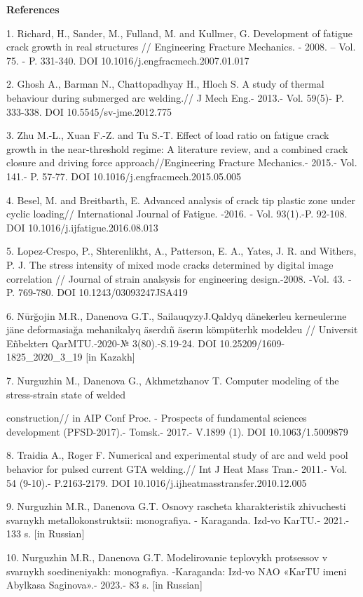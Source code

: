 \begin{center}
{\bfseries References}
\end{center}

\begin{noparindent}
1. Richard, H., Sander, M., Fulland, M. and Kullmer, G. Development of
fatigue crack growth in real structures // Engineering Fracture
Mechanics. - 2008. -- Vol. 75. - P. 331-340. DOI
10.1016/j.engfracmech.2007.01.017

2. Ghosh A., Barman N., Chattopadhyay H., Hloch S. A study of thermal
behaviour during submerged arc welding.// J Mech Eng.- 2013.- Vol.
59(5)- P. 333-338. DOI 10.5545/sv-jme.2012.775

3. Zhu M.-L., Xuan F.-Z. and Tu S.-T. Effect of load ratio on fatigue
crack growth in the near-threshold regime: A literature review, and a
combined crack closure and driving force approach//Engineering Fracture
Mechanics.- 2015.- Vol. 141.- P. 57-77. DOI
10.1016/j.engfracmech.2015.05.005

4. Besel, M. and Breitbarth, E. Advanced analysis of crack tip plastic
zone under cyclic loading// International Journal of Fatigue. -2016. -
Vol. 93(1).-P. 92-108. DOI 10.1016/j.ijfatigue.2016.08.013

5. Lopez-Crespo, P., Shterenlikht, A., Patterson, E. A., Yates, J. R.
and Withers, P. J. The stress intensity of mixed mode cracks determined
by digital image correlation // Journal of strain analsysis for
engineering design.-2008. -Vol. 43. - P. 769-780. DOI
10.1243/03093247JSA419

6. Nūrğojin M.R., Danenova G.T., SailauqyzyJ.Qaldyq dänekerleu
kerneulerıne jäne deformasiağa mehanikalyq äserdıñ äserın kömpüterlık
modeldeu // Universit Eñbekterı QarMTU.-2020-№ 3(80).-S.19-24. DOI
10.25209/1609- 1825\_2020\_3\_19 {[}in Kazakh{]}

7. Nurguzhin M., Danenova G., Akhmetzhanov T. Computer modeling of the
stress-strain state of welded

construction// in AIP Conf Proc. -
Prospects of fundamental sciences development (PFSD-2017).- Tomsk.-
2017.- V.1899 (1). DOI 10.1063/1.5009879

8. Traidia A., Roger F. Numerical and experimental study of arc and weld
pool behavior for pulsed current GTA welding.// Int J Heat Mass Tran.-
2011.- Vol. 54 (9-10).- P.2163-2179. DOI
10.1016/j.ijheatmasstransfer.2010.12.005

9. Nurguzhin M.R., Danenova G.T. Osnovy rascheta kharakteristik
zhivuchesti svarnykh metallokonstruktsii: monografiya. - Karaganda.
Izd-vo KarTU.- 2021.- 133 s. {[}in Russian{]}

10. Nurguzhin M.R., Danenova G.T. Modelirovanie teplovykh protsessov v
svarnykh soedineniyakh: monografiya. -Karaganda: Izd-vo NAO «KarTU imeni
Abylkasa Saginova».- 2023.- 83 s. {[}in Russian{]}
\end{noparindent}

